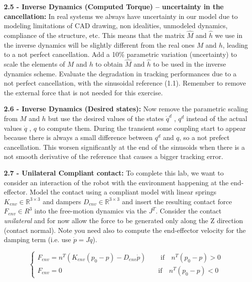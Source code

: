 \documentclass[11pt]{article}
\newcommand{\Rnum}{\mathbb{R}} %
\begin{document}
\quad

\noindent
\textbf{2.5 - Inverse Dynamics (Computed Torque) – uncertainty in the cancellation:}
%
In real systems we always have uncertainty in our model due to modeling 
limitations of  CAD  drawing, non idealities, unmodeled dynamics, compliance of the structure, etc.
This means that the matrix $\hat{M}$ and $\hat{h}$ we use in the inverse dynamics will be slightly different from the real ones ${M}$ and ${h}$, leading to a not perfect cancellation. Add a 10\%   parametric variation (uncertainty) to scale the elements of $M$ and $h$  to obtain $\hat{M}$ and $\hat{h}$  to be used in the inverse dynamics scheme. %
Evaluate the degradation in tracking performances due to a not perfect cancellation, with the sinusoidal reference (1.1). Remember to remove the external force that is not needed for this exercise.

\quad

\noindent
\textbf{ 2.6 - Inverse Dynamics (Desired states):}
Now remove  the parametric scaling from  $M$ and $h$  but use the desired values of the states $\dot{q}^d$ , $q^d$  instead of 
the actual values $\dot{q}$ , $q$ to compute them. During the transient some coupling start to appear because there is always a small difference between $q^d$ and $q$, so a not prefect cancellation. This worsen significantly at the end of the sinusoids when there is a not smooth derivative of the reference that causes a bigger tracking error.
 
\quad

\noindent 
\textbf{ 2.7 - Unilateral Compliant contact:} 
To complete this lab, we want to consider an interaction of the robot with the environment happening at the end-effector. 
Model the contact using a compliant model with linear  springs $K_{env}\in \Rnum^{3 \times 3}$ and dampers $D_{env}\in \Rnum^{3 \times 3}$  and insert the resulting contact force $F_{env} \in R^3$ into the free-motion dynamics via the $J^T$. Consider the contact \textit{unilateral} and for now allow the force to be generated only along the Z direction (contact normal).
Note you need also to compute the end-effector velocity for the damping term (i.e. use $\dot{p} = J\dot{q}$).

\begin{equation*}
\begin{cases}
	F_{env} = n^T (K_{env}(p_0 - p) - D_{env} \dot{p}) \quad &\text{   if}\quad n^T(p_0 -p ) >0 \\ 
	F_{env} = 0     \quad &\text{if}\quad n^T(p_0 -p ) <0
\end{cases}
\end{equation*}
\end{document}
